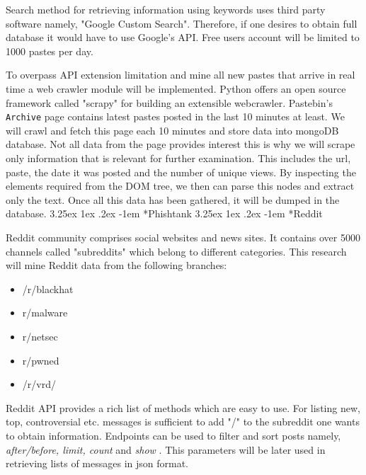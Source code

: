 \documentclass[12pt]{article}
\makeatletter
\renewcommand\paragraph{\@startsection{paragraph}{5}{\z@}%
  {3.25ex \@plus1ex \@minus.2ex}%
  {-1em}%
  {\normalfont\normalsize\bfseries}}
\makeatother
\begin{document}
Search method for retrieving information using keywords uses third party software namely, "Google Custom Search". Therefore, if one desires to obtain full database it would have to use Google's API. Free users account will be limited to 1000 pastes per day. 

To overpass API extension limitation and mine all new pastes that arrive in real time a web crawler module will be implemented. Python offers an open source framework called "scrapy" \cite{scrapy} for building an extensible webcrawler. Pastebin's \texttt{Archive} page contains latest pastes posted in the last 10 minutes at least. We will crawl and fetch this page each 10 minutes and store data into mongoDB database. Not all data from the page provides interest this is why we will scrape only information that is relevant for further examination. This includes the url, paste, the date it was posted and the number of unique views. By inspecting the elements required from the DOM tree, we then can parse this nodes and extract only the text. Once all this data has been gathered, it will be dumped in the database.
\paragraph*{Phishtank}
\paragraph*{Reddit}
\hfill \break
Reddit community comprises social websites and news sites. It contains over 5000 channels called "subreddits" which belong to different categories. This research will mine Reddit \cite{reddit} data from the following branches:
\begin{itemize}
\item /r/blackhat \cite{red-blackhat}
\item r/malware \cite{r.malware}
\item r/netsec \cite{r.netsec}
\item r/pwned \cite{r.pwned}
\item /r/vrd/ \cite{r.rvd}

\end{itemize}

Reddit API\cite{reddit} provides a rich list of methods which are easy to use. For listing new, top, controversial etc. messages is sufficient to add "/" to the subreddit one wants to obtain information. Endpoints can be used to filter and sort posts namely, \textit{after/before, limit, count} and \textit{show} \cite{reddit}. This parameters will be later used in retrieving lists of messages in json format. 
\end{document}
